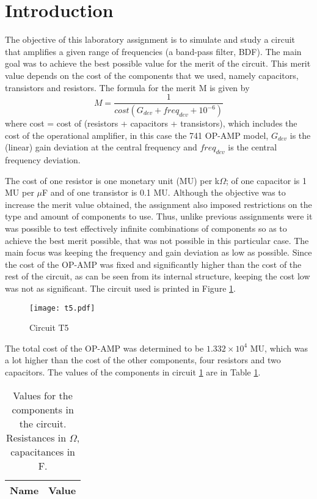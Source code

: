 \section{Introduction}
\label{sec:introduction}

The objective of this laboratory assignment is to simulate and study a circuit that amplifies a given range of frequencies (a band-pass filter, BDF). The main goal was to achieve the best possible value for the merit of the circuit. This merit value depends on the cost of the components that we used, namely capacitors, transistors and resistors. The formula for the merit M is given by 
\begin{equation}
   M= \frac{1}{cost (G_{dev} + freq_{dev} + 10^{-6})}
\end{equation}
where cost = cost of (resistors + capacitors + transistors), which includes the cost of the operational amplifier, in this case the 741 OP-AMP model, $G_{dev}$ is the (linear) gain deviation at the central frequency and $freq_{dev}$ is the central frequency deviation.


The cost of one resistor is one monetary unit (MU) per k$\Omega$; of one capacitor is 1 MU per $\mu$F and of one transistor is 0.1 MU. Although the objective was to increase the merit value obtained, the assignment also imposed restrictions on the type and amount of components to use. Thus, unlike previous assignments were it was possible to test effectively infinite combinations of components so as to achieve the best merit possible, that was not possible in this particular case. The main focus was keeping the frequency and gain deviation as low as possible. Since the cost of the OP-AMP was fixed and significantly higher than the cost of the rest of the circuit, as can be seen from its internal structure, keeping the cost low was not as significant. The circuit used is printed in Figure \ref{circuit}.

\begin{figure}[H] \centering
\texttt{[image: t5.pdf]} 
\caption{Circuit T5}
\label{circuit}
\end{figure}

The total cost of the OP-AMP was determined to be $1.332\times 10^4$ MU, which was a lot higher than the cost of the other components, four resistors and two capacitors. The values of the components in circuit \ref{circuit} are in Table \ref{tab_valores}.
\begin{table}[H]
\centering
    \begin{tabular}{c|c}        %
\hline                      %

\textbf{Name}  & \textbf{Value}\\     
\hline                      %

\hline                      %
\end{tabular}
    \caption{Values for the components in the circuit. Resistances in $\Omega$, capacitances in F.}
 \label{tab_valores}
\end{table}  

